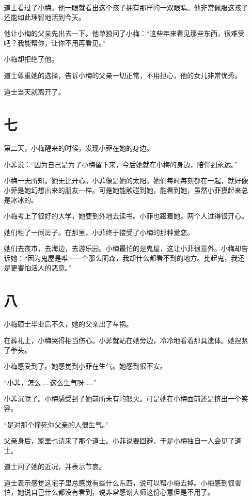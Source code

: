 \documentclass[12pt,a4paper]{ctexart}
\begin{document}
道士看过了小梅。他一眼就看出这个孩子拥有那样的一双眼睛。他非常佩服这孩子还能如此理智地活到今天。

他让小梅的父亲先出去一下。他单独问了小梅：“这些年来看见那些东西，很难受吧？我能帮你，让你不用再看见。”

小梅却拒绝了他。

道士尊重她的选择，告诉小梅的父亲一切正常，不用担心，他的女儿非常优秀。

道士当天就离开了。

\section*{七}

第二天，小梅醒来的时候，发现小菲在她的身边。

小菲说：“因为自己是为了小梅留下来，今后她就在小梅的身边，陪伴到永远。”

小梅一无所知。她无比开心。小菲像是她的太阳。她们每时每刻都在一起，就好像小菲是她幻想出来的朋友一样。可是她能触碰到她，能看到她，虽然小菲摸起来总是冰冰的。

小梅考上了很好的大学，她要到外地去读书。小菲也跟着她。两个人过得很开心。

她们租了一间房子。在那里，小菲终于接受了小梅的那种爱恋。

她们去夜市，去海边，去游乐园。小梅最怕的是鬼屋，这让小菲很意外。小梅却告诉她：“因为鬼屋是唯一一个那么阴森，我却什么都看不到的地方。比起鬼，我还是更害怕活人的恶意。”

\section*{八}

小梅硕士毕业后不久，她的父亲出了车祸。

在葬礼上，小梅哭得相当伤心。小菲就站在她旁边，冷冷地看着那具遗体。她捏紧了拳头。

小梅感受到了。她感觉到小菲在生气。她感到很不安。

“小菲，怎么……这么生气呀……”

小菲沉默了。小梅感受到了她前所未有的怒火。可是她在小梅面前还是挤出一个笑容。

“是对那个撞死你父亲的人很生气。”

父亲身后，家里也请来了那个道士。小菲说要回避，于是小梅独自一人会见了道士。

道士问了她的近况，并表示节哀。

道士表示感觉这宅子里总感觉有些什么东西，说可以帮小梅去掉。小梅感到很害怕，她说自己什么都没有看到，说非常感谢大师这份心意但是不用了。
\end{document}
